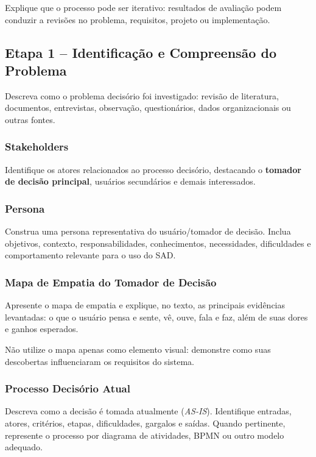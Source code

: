 \documentclass[12pt]{article}
\begin{document}
Explique que o processo pode ser iterativo: resultados de avaliação podem conduzir a revisões no problema, requisitos, projeto ou implementação.

\subsection{Etapa 1 -- Identificação e Compreensão do Problema}

Descreva como o problema decisório foi investigado: revisão de literatura, documentos, entrevistas, observação, questionários, dados organizacionais ou outras fontes.

\subsubsection{Stakeholders}

Identifique os atores relacionados ao processo decisório, destacando o \textbf{tomador de decisão principal}, usuários secundários e demais interessados.

\subsubsection{Persona}

Construa uma persona representativa do usuário/tomador de decisão. Inclua objetivos, contexto, responsabilidades, conhecimentos, necessidades, dificuldades e comportamento relevante para o uso do SAD.

\subsubsection{Mapa de Empatia do Tomador de Decisão}

Apresente o mapa de empatia e explique, no texto, as principais evidências levantadas: o que o usuário pensa e sente, vê, ouve, fala e faz, além de suas dores e ganhos esperados.

Não utilize o mapa apenas como elemento visual: demonstre como suas descobertas influenciaram os requisitos do sistema.

\subsubsection{Processo Decisório Atual}

Descreva como a decisão é tomada atualmente (\textit{AS-IS}). Identifique entradas, atores, critérios, etapas, dificuldades, gargalos e saídas. Quando pertinente, represente o processo por diagrama de atividades, BPMN ou outro modelo adequado.
\end{document}

